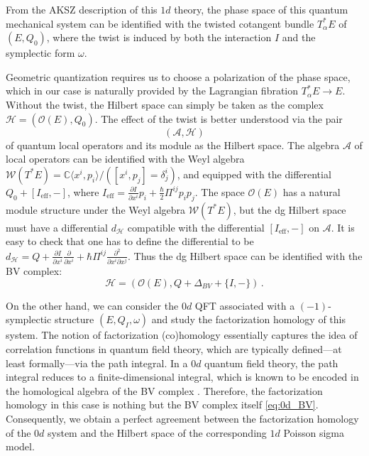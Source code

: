 \documentclass[11pt]{article}
\newcommand{\C}{\mathbb{C}}
\numberwithin{equation}{section}
\begin{document}
From the AKSZ description of this $1d$ theory, the phase space of this quantum mechanical system can be identified with the twisted cotangent bundle $T^*_{\alpha}E$ of $(E,Q_0)$, where the twist is induced by both the interaction $I$ and the symplectic form $\omega$. 

Geometric quantization requires us to choose a polarization of the phase space, which in our case is naturally provided by the Lagrangian fibration $T^*_{\alpha}E \to E$. Without the twist, the Hilbert space can simply be taken as the complex $\mathcal{H} = (\mathcal{O}(E), Q_0)$. The effect of the twist is better understood via the pair
\begin{equation}
	(\mathcal{A}, \mathcal{H})
\end{equation} 
of quantum local operators and its module as the Hilbert space. The algebra $\mathcal{A}$ of local operators can be identified with the Weyl algebra $\mathcal{W}(T^*E) = \C\langle x^i,p_i\rangle/([x^i, p_j] = \delta^i_j)$, and equipped with the differential $Q_0 + [I_{\mathrm{eff}},-]$, where $I_{\mathrm{eff}} =\frac{\partial I}{\partial x^i} p_i + \frac{\hbar}{2}\Pi^{ij}p_ip_j$. The space $\mathcal{O}(E)$ has a natural module structure under the Weyl algebra $\mathcal{W}(T^*E)$, but the dg Hilbert space must have a differential $d_{\mathcal{H}}$ compatible with the differential $[I_{\mathrm{eff}},-]$ on $\mathcal{A}$. It is easy to check that one has to define the differential to be $d_{\mathcal{H}} = Q + \frac{\partial I}{\partial x^i}\frac{\partial}{\partial x^i} + \hbar \Pi^{ij} \frac{\partial^2}{\partial x^i \partial x^j}$. Thus the dg Hilbert space can be identified with the BV complex:
\begin{equation}
	\mathcal{H} = (\mathcal{O}(E), Q + \Delta_{BV} + \{I,-\})\,.
\end{equation}



On the other hand, we can consider the $0d$ QFT associated with a $(-1)$-symplectic structure $(E,Q_I,\omega)$ and study the factorization homology of this system. The notion of factorization (co)homology essentially captures the idea of correlation functions in quantum field theory, which are typically defined—at least formally—via the path integral. In a $0d$ quantum field theory, the path integral reduces to a finite-dimensional integral, which is known to be encoded in the homological algebra of the BV complex \cite{costello2011re}. Therefore, the factorization homology in this case is nothing but the BV complex itself \eqref{eq:0d_BV}. Consequently, we obtain a perfect agreement between the factorization homology of the $0d$ system and the Hilbert space of the corresponding $1d$ Poisson sigma model.
\end{document}
